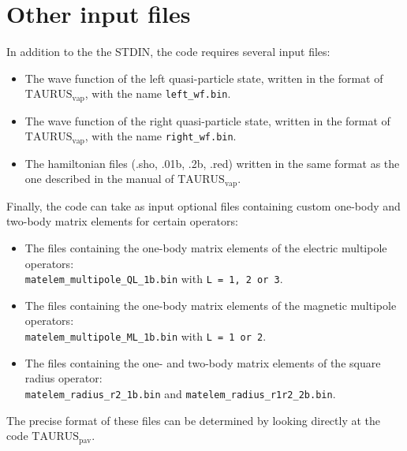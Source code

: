 \documentclass[a4paper,11pt]{article}
\newcommand{\TAURUSvap}{$\text{TAURUS}_{\text{vap}}$}
\newcommand{\TAURUSpav}{$\text{TAURUS}_{\text{pav}}$}
\newcommand{\ttt}[1]{\texttt{#1}}
\begin{document}
%
% 
\section{Other input files}

In addition to the the STDIN, the code requires several input files:
\begin{itemize}
  \item The wave function of the left quasi-particle state, written in the format of \TAURUSvap, with the name \ttt{left\_wf.bin}.
  \item The wave function of the right quasi-particle state, written in the format of \TAURUSvap, with the name \ttt{right\_wf.bin}.
  \item The hamiltonian files (.sho, .01b, .2b, .red) written in the same format as the one described in the manual of \TAURUSvap.
\end{itemize}

Finally, the code can take as input optional files containing custom one-body and two-body matrix elements for certain operators:
\begin{itemize}
  \item The files containing the one-body matrix elements of the electric multipole operators: \\ 
  \ttt{matelem\_multipole\_QL\_1b.bin} with \ttt{L = 1, 2 or 3}.
  \item The files containing the one-body matrix elements of the magnetic multipole operators: \\ 
  \ttt{matelem\_multipole\_ML\_1b.bin} with \ttt{L = 1 or 2}.
  \item The files containing the one- and two-body matrix elements of the square radius operator: \\ 
  \ttt{matelem\_radius\_r2\_1b.bin} and \ttt{matelem\_radius\_r1r2\_2b.bin}.
\end{itemize}
The precise format of these files can be determined by looking directly at the code \TAURUSpav.

%
%
\end{document}
